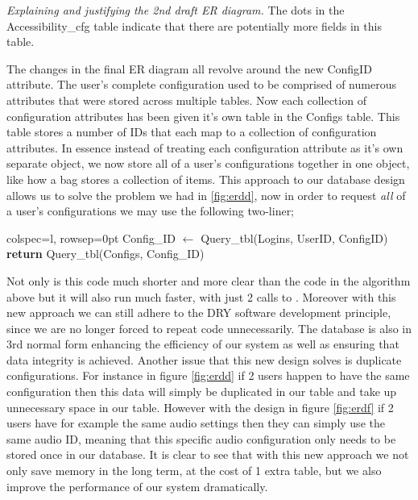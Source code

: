 \textit{Explaining and justifying the 2nd draft ER diagram.}
The dots in the {\sffamily Accessibility\_cfg} table indicate
that there are potentially more fields in this table. \\ \vspace{0.2cm}

The changes in the final ER diagram all revolve around the new
ConfigID attribute. The user's complete configuration used to 
be comprised of numerous attributes that were stored across
multiple tables. Now each collection of configuration
attributes has been given it's own table in the
{\sffamily Configs} table. This table stores a number of IDs
that each map to a collection of configuration attributes.
In essence instead of treating each configuration attribute as
it's own separate object, we now store all of a user's 
configurations together in one object, like how a bag stores
a collection of items. This approach to our database design
allows us to solve the problem we had in \ref{fig:erdd}, now
in order to request \textit{all} of a user's configurations
we may use the following two-liner;\\

\begin{center}
\begin{tblr}{colspec={l}, rowsep=0pt}
  {\sffamily Config\_ID} $\gets$ {\sffamily Query\_tbl(Logins, UserID, ConfigID)}\\
  {\sffamily \textbf{return} Query\_tbl(Configs, Config\_ID)}\\
\end{tblr}
\end{center}

Not only is this code much shorter and more clear than the 
code in the algorithm above but it will also run much
faster, with just 2 calls to . Moreover
with this new approach we can still adhere to the DRY software
development principle, since we are no longer forced to repeat
code unnecessarily. The database is also in 3rd normal form
enhancing the efficiency of our system as 
well as ensuring that data integrity is achieved.
Another issue that this new design solves
is duplicate configurations. For instance in figure 
\ref{fig:erdd} if 2 users happen to have the same
configuration then this data will simply be duplicated in our 
table and take up unnecessary space in our table. However 
with the design in figure \ref{fig:erdf} if 2 users have for
example the same audio settings then they can simply use the
same audio ID, meaning that this specific audio configuration 
only needs to be stored once in our database. It is clear to 
see that with this new approach we not only save memory in 
the long term, at the cost of 1 extra table, but we also 
improve the performance of our system dramatically. \\
\vspace{0.2cm}

